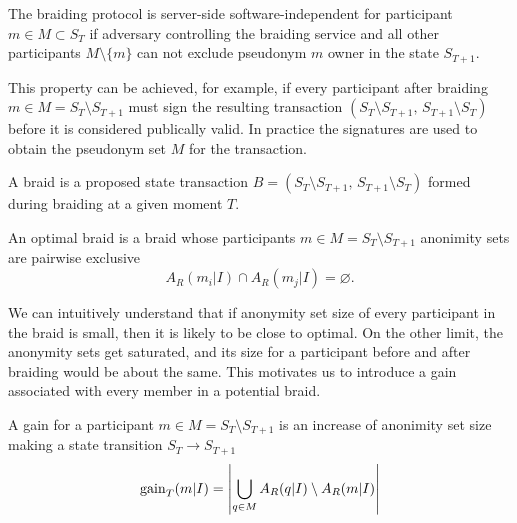 \documentclass[12pt]{article}
\newenvironment{definition}[2][Definition]{\begin{trivlist}
\item[\hskip \labelsep {\bfseries #1}\hskip \labelsep {\bfseries #2.}]}{\end{trivlist}}
\begin{document}
\begin{definition}{(software-indpendance)}
  The braiding protocol is server-side software-independent for participant $m \in M \subset S_T$ if adversary controlling the braiding service and all other participants $M \setminus \{m\}$ can not exclude pseudonym $m$ owner in the state $S_{T+1}$.
\end{definition}

This property can be achieved, for example, if every participant after braiding $m \in M = S_T \setminus S_{T+1}$ must sign the resulting transaction $(S_T \setminus S_{T+1}, \, S_{T+1} \setminus S_T)$ before it is considered publically valid. In practice the signatures are used to obtain the pseudonym set $M$ for the transaction.

\begin{definition}{(braid)}
  A braid is a proposed state transaction $B = (S_T \setminus S_{T+1}, \, S_{T+1} \setminus S_T)$ formed during braiding at a given moment $T$.
\end{definition}

\begin{definition}{(optimal braid)}
  An optimal braid is a braid whose participants $m \in M = S_T \setminus S_{T+1}$ anonimity sets are pairwise exclusive
  \begin{equation}
    A_R(m_i|I) \cap A_R(m_j|I) = \varnothing.
  \end{equation}
\end{definition}

We can intuitively understand that if anonymity set size of every participant in the braid is small, then it is likely to be close to optimal. On the other limit, the anonymity sets get saturated, and its size for a participant before and after braiding would be about the same. This motivates us to introduce a gain associated with every member in a potential braid.

\begin{definition}{(gain)}
  A gain for a participant $m \in M = S_T \setminus S_{T+1}$ is an increase of anonimity set size making a state transition $S_T \to S_{T+1}$
  \begin{equation}
    {\rm gain}_T(m | I) = \left|\bigcup_{q \in M} A_R (q| I)  \setminus A_R(m | I) \right| 
  \end{equation}
\end{definition}
\end{document}
